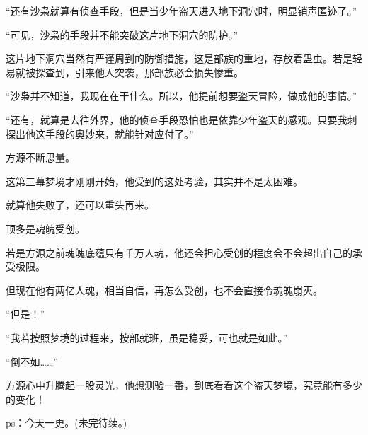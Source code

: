 \begin{this_body}
“还有沙枭就算有侦查手段，但是当少年盗天进入地下洞穴时，明显销声匿迹了。”

“可见，沙枭的手段并不能突破这片地下洞穴的防护。”

这片地下洞穴当然有严谨周到的防御措施，这是部族的重地，存放着蛊虫。若是轻易就被探查到，引来他人突袭，那部族必会损失惨重。

“沙枭并不知道，我现在在干什么。所以，他提前想要盗天冒险，做成他的事情。”

“还有，就算是去往外界，他的侦查手段恐怕也是依靠少年盗天的感观。只要我刺探出他这手段的奥妙来，就能针对应付了。”

方源不断思量。

这第三幕梦境才刚刚开始，他受到的这处考验，其实并不是太困难。

就算他失败了，还可以重头再来。

顶多是魂魄受创。

若是方源之前魂魄底蕴只有千万人魂，他还会担心受创的程度会不会超出自己的承受极限。

但现在他有两亿人魂，相当自信，再怎么受创，也不会直接令魂魄崩灭。

“但是！”

“我若按照梦境的过程来，按部就班，虽是稳妥，可也就是如此。”

“倒不如……”

方源心中升腾起一股灵光，他想测验一番，到底看看这个盗天梦境，究竟能有多少的变化！

ps：今天一更。(未完待续。)

\end{this_body}


